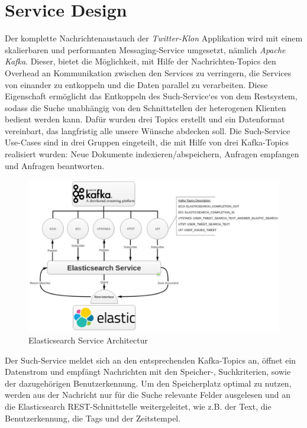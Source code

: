 \section{Service Design}
Der komplette Nachrichtenaustauch der \textit{Twitter-Klon} Applikation wird mit einem skalierbaren und performanten Messaging-Service umgesetzt, nämlich \textit{Apache Kafka}. Dieser, bietet die Möglichkeit, mit Hilfe der Nachrichten-Topics den Overhead an Kommunikation zwischen den Services zu verringern, die Services von einander zu entkoppeln und die Daten parallel zu verarbeiten.
Diese Eigenschaft ermöglicht das Entkoppeln des Such-Service‘es von dem Restsystem, sodass die Suche unabhängig von den Schnittstellen der heterogenen Klienten bedient werden kann. 
Dafür wurden drei Topics erstellt und ein Datenformat vereinbart, das langfristig alle unsere Wünsche abdecken soll. Die Such-Service Use-Cases sind in drei Gruppen eingeteilt, die mit Hilfe von drei Kafka-Topics realisiert wurden: Neue Dokumente indexieren/abspeichern, Anfragen empfangen und Anfragen beantworten.
\begin{figure}[htbp!]
	\includegraphics[scale=0.8]{material/architecture/Elasticsearch.png}
	\caption{Elasticsearch Service Architectur}
	\label{fig:ESA}
\end{figure}

Der Such-Service meldet sich an den entsprechenden Kafka-Topics an, öffnet ein Datenstrom und empfängt Nachrichten mit den Speicher-, Suchkriterien, sowie der dazugehörigen Benutzerkennung. Um den Speicherplatz optimal zu nutzen, werden aus der Nachricht nur für die Suche relevante Felder ausgelesen und an die Elasticsearch REST-Schnittstelle weitergeleitet, wie z.B. der Text, die Benutzerkennung, die Tags und der Zeitstempel.  

